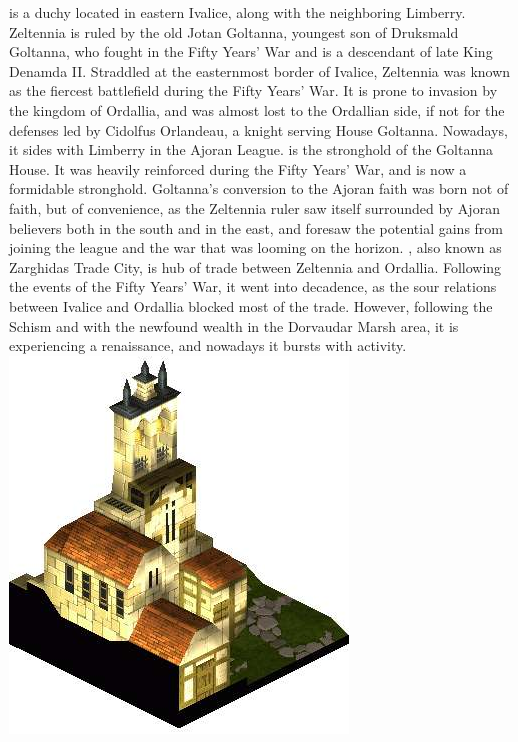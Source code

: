 \newpage
%
 is a duchy located in eastern Ivalice, along with the neighboring Limberry.
Zeltennia is ruled by the old Jotan Goltanna, youngest son of Druksmald Goltanna, who fought in the Fifty Years' War and is a descendant of late King Denamda II. 
Straddled at the easternmost border of Ivalice, Zeltennia was known as the fiercest battlefield during the Fifty Years' War. 
It is prone to invasion by the kingdom of Ordallia, and was almost lost to the Ordallian side, if not for the defenses led by Cidolfus Orlandeau, a knight serving House Goltanna.
Nowadays, it sides with Limberry in the Ajoran League.
 is the stronghold of the Goltanna House.
It was heavily reinforced during the Fifty Years' War, and is now a formidable stronghold.
Goltanna's conversion to the Ajoran faith was born not of faith, but of convenience, as the Zeltennia ruler saw itself surrounded by Ajoran believers both in the south and in the east, and foresaw the potential gains from joining the league and the war that was looming on the horizon.
, also known as Zarghidas Trade City, is hub of trade between Zeltennia and Ordallia. 
Following the events of the Fifty Years' War, it went into decadence, as the sour relations between Ivalice and Ordallia blocked most of the trade. 
However, following the Schism and with the newfound wealth in the Dorvaudar Marsh area, it is experiencing a renaissance, and nowadays it bursts with activity.
%
\ofpar
\includegraphics[width=\columnwidth]{./art/worldbook/zeltenniachapel.jpg}
